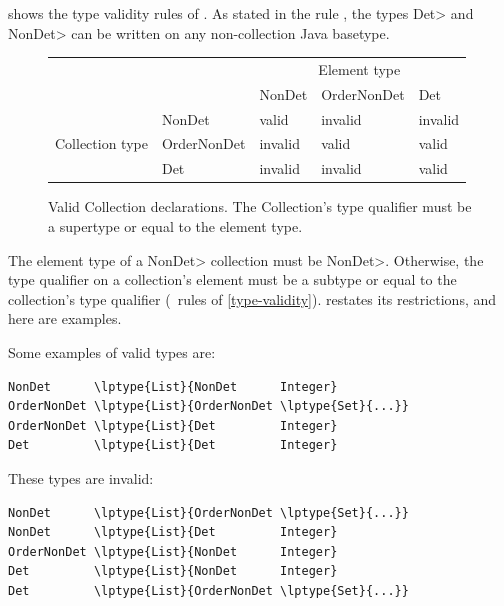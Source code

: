 shows the type validity
rules of \ourTypeSystem. 
As stated in the rule , the types \<Det> and \<NonDet>
can be written on any non-collection Java basetype.

\begin{figure}
    \centering
    \begin{tabular}{|l|l|l|l|l|}
        \cline{3-5}
        \multicolumn{2}{c|}{~}  &  \multicolumn{3}{c|}{Element type} \\ \cline{3-5}
        \multicolumn{2}{c|}{~}  & NonDet     & OrderNonDet & Det \\ \hline
                        & NonDet      &  valid     &  invalid    & invalid  \\ \cline{2-5}
        Collection type & OrderNonDet &  invalid   &  valid      & valid    \\ \cline{2-5}
                        & Det         &  invalid   &  invalid    & valid    \\ \hline
    \end{tabular}
    \caption{Valid Collection declarations.  The Collection's type qualifier
        must be a supertype or equal to the element type.}
    \label{fig:determinism-collections}
\end{figure}

The element type of a \<NonDet> collection must be \<NonDet>.
Otherwise, the type qualifier on a collection's element must be a subtype or equal to
the collection's type qualifier (\ rules of
\cref{type-validity}).
 restates its restrictions, and here are examples.

\smallskip
\noindent
\begin{minipage}{.48\textwidth}
Some examples of valid types are:
\begin{smaller}
\begin{Verbatim}[commandchars=\\\{\}]
NonDet      \lptype{List}{NonDet      Integer}
OrderNonDet \lptype{List}{OrderNonDet \lptype{Set}{...}}
OrderNonDet \lptype{List}{Det         Integer}
Det         \lptype{List}{Det         Integer}

\end{Verbatim}
\end{smaller}
\end{minipage}
\hfill
\begin{minipage}{.46\textwidth}
These types are invalid:
\begin{smaller}
\begin{Verbatim}[commandchars=\\\{\}]
NonDet      \lptype{List}{OrderNonDet \lptype{Set}{...}}
NonDet      \lptype{List}{Det         Integer}
OrderNonDet \lptype{List}{NonDet      Integer}
Det         \lptype{List}{NonDet      Integer}
Det         \lptype{List}{OrderNonDet \lptype{Set}{...}}
\end{Verbatim}
\end{smaller}
\end{minipage}
\smallskip


